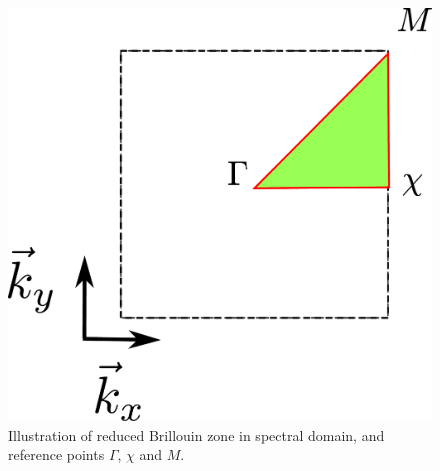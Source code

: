 \begin{figure}
\centering
\includegraphics[scale=0.2]{./img/reduced_brillouin_zone.pdf}
\caption{Illustration of reduced Brillouin zone in spectral domain, and reference points $\Gamma$, $\chi$ and $M$.}
\label{fig:Brillouin}
\end{figure}
 
